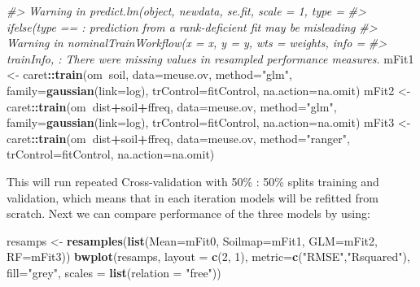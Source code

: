\documentclass[11pt]{krantz}
\newenvironment{Shaded}{\begin{snugshade}}{\end{snugshade}}
\newcommand{\CommentTok}[1]{\textcolor[rgb]{0.37,0.37,0.37}{\textit{#1}}}
\newcommand{\DataTypeTok}[1]{\textcolor[rgb]{0.27,0.27,0.27}{#1}}
\newcommand{\DecValTok}[1]{\textcolor[rgb]{0.06,0.06,0.06}{#1}}
\newcommand{\KeywordTok}[1]{\textcolor[rgb]{0.27,0.27,0.27}{\textbf{#1}}}
\newcommand{\NormalTok}[1]{#1}
\newcommand{\OperatorTok}[1]{\textcolor[rgb]{0.43,0.43,0.43}{\textbf{#1}}}
\newcommand{\StringTok}[1]{\textcolor[rgb]{0.5,0.5,0.5}{#1}}
\theoremstyle{definition}
\theoremstyle{definition}
\theoremstyle{definition}
\theoremstyle{remark}
\begin{document}
\begin{Shaded}
\begin{Highlighting}[]
\CommentTok{#> Warning in predict.lm(object, newdata, se.fit, scale = 1, type =}
\CommentTok{#> ifelse(type == : prediction from a rank-deficient fit may be misleading}
\CommentTok{#> Warning in nominalTrainWorkflow(x = x, y = y, wts = weights, info =}
\CommentTok{#> trainInfo, : There were missing values in resampled performance measures.}
\NormalTok{mFit1 <-}\StringTok{ }\NormalTok{caret}\OperatorTok{::}\KeywordTok{train}\NormalTok{(om}\OperatorTok{~}\NormalTok{soil, }\DataTypeTok{data=}\NormalTok{meuse.ov, }\DataTypeTok{method=}\StringTok{"glm"}\NormalTok{, }
               \DataTypeTok{family=}\KeywordTok{gaussian}\NormalTok{(}\DataTypeTok{link=}\NormalTok{log), }\DataTypeTok{trControl=}\NormalTok{fitControl, }
               \DataTypeTok{na.action=}\NormalTok{na.omit)}
\NormalTok{mFit2 <-}\StringTok{ }\NormalTok{caret}\OperatorTok{::}\KeywordTok{train}\NormalTok{(om}\OperatorTok{~}\NormalTok{dist}\OperatorTok{+}\NormalTok{soil}\OperatorTok{+}\NormalTok{ffreq, }\DataTypeTok{data=}\NormalTok{meuse.ov, }\DataTypeTok{method=}\StringTok{"glm"}\NormalTok{, }
               \DataTypeTok{family=}\KeywordTok{gaussian}\NormalTok{(}\DataTypeTok{link=}\NormalTok{log), }\DataTypeTok{trControl=}\NormalTok{fitControl, }
               \DataTypeTok{na.action=}\NormalTok{na.omit)}
\NormalTok{mFit3 <-}\StringTok{ }\NormalTok{caret}\OperatorTok{::}\KeywordTok{train}\NormalTok{(om}\OperatorTok{~}\NormalTok{dist}\OperatorTok{+}\NormalTok{soil}\OperatorTok{+}\NormalTok{ffreq, }\DataTypeTok{data=}\NormalTok{meuse.ov, }\DataTypeTok{method=}\StringTok{"ranger"}\NormalTok{, }
               \DataTypeTok{trControl=}\NormalTok{fitControl, }\DataTypeTok{na.action=}\NormalTok{na.omit)}
\end{Highlighting}
\end{Shaded}

This will run repeated Cross-validation with 50\% : 50\% splits training
and validation, which means that in each iteration models will be
refitted from scratch. Next we can compare performance of the three
models by using:

\begin{Shaded}
\begin{Highlighting}[]
\NormalTok{resamps <-}\StringTok{ }\KeywordTok{resamples}\NormalTok{(}\KeywordTok{list}\NormalTok{(}\DataTypeTok{Mean=}\NormalTok{mFit0, }\DataTypeTok{Soilmap=}\NormalTok{mFit1, }\DataTypeTok{GLM=}\NormalTok{mFit2, }\DataTypeTok{RF=}\NormalTok{mFit3))}
\KeywordTok{bwplot}\NormalTok{(resamps, }\DataTypeTok{layout =} \KeywordTok{c}\NormalTok{(}\DecValTok{2}\NormalTok{, }\DecValTok{1}\NormalTok{), }\DataTypeTok{metric=}\KeywordTok{c}\NormalTok{(}\StringTok{"RMSE"}\NormalTok{,}\StringTok{"Rsquared"}\NormalTok{), }
       \DataTypeTok{fill=}\StringTok{"grey"}\NormalTok{, }\DataTypeTok{scales =} \KeywordTok{list}\NormalTok{(}\DataTypeTok{relation =} \StringTok{"free"}\NormalTok{))}
\end{Highlighting}
\end{Shaded}
\end{document}
